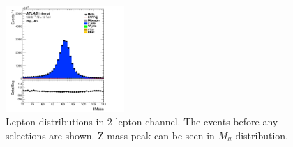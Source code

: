 \begin{figure}[H]
    \centering
    \includegraphics[width=0.4\textwidth]{figures/2lep/dataMC/C_0ptag1pfat0pjet_0ptv_ALL_llMass_Lin}
    \caption{Lepton distributions in 2-lepton channel. The events before any selections are shown. Z mass peak can be seen in $M_{ll}$ distribution.}
    \label{fig:2lepLeptons}
\end{figure}

